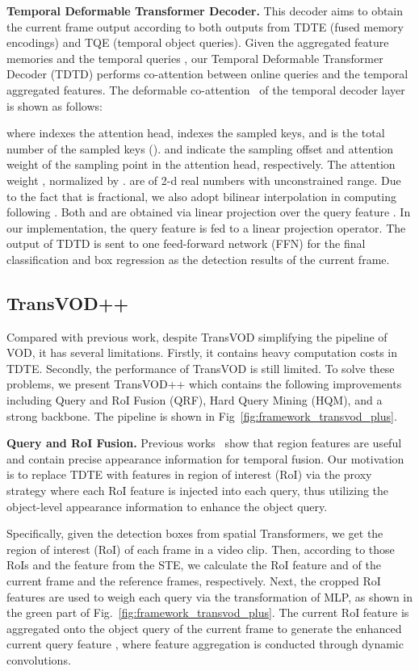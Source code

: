 \documentclass[10pt,journal,compsoc]{IEEEtran}
\begin{document}
\noindent
\textbf{Temporal Deformable Transformer Decoder.}
This decoder aims to obtain the current frame output according to both outputs from TDTE (fused memory encodings) and TQE (temporal object queries). Given the aggregated feature memories   and the temporal queries , our Temporal Deformable Transformer Decoder (TDTD) performs co-attention between online queries and the temporal aggregated features.
The deformable co-attention~\cite{zhu2020deformable} of the temporal decoder layer is shown as follows:

where  indexes the attention head,  indexes the sampled keys, and  is the total number of the sampled keys ().
 and  indicate the sampling offset and attention weight of the  sampling point in the  attention head, respectively.
The attention weight , normalized by .  are of 2-d real numbers with unconstrained range. Due to the fact that  is fractional, we also adopt bilinear interpolation in computing  following \cite{dai2017deformable}. 
Both  and  are obtained via linear projection over the query feature . In our implementation, the query feature  is fed to a linear projection operator. The output of TDTD is sent to one feed-forward network (FFN) for the final classification and box regression as the detection results of the current frame.

\vspace{-4mm}
\subsection{TransVOD++}
\label{sec:TransVOD++}
Compared with previous work, despite TransVOD simplifying the pipeline of VOD, it has several limitations. Firstly, it contains heavy computation costs in TDTE. Secondly, the performance of TransVOD is still limited. To solve these problems, we present TransVOD++ which contains the following improvements including Query and RoI Fusion (QRF), Hard Query Mining (HQM), and a strong backbone. The pipeline is shown in Fig~\ref{fig:framework_transvod_plus}.

\noindent
\textbf{Query and RoI Fusion.} Previous works~\cite{chen2020memory,hu18relationnet} show that region features are useful and contain precise appearance information for temporal fusion. Our motivation is to replace TDTE with features in region of interest (RoI) via the proxy strategy where each RoI feature is injected into each query, thus utilizing the object-level appearance information to enhance the object query.


Specifically, given the detection boxes from spatial Transformers, we get the region of interest (RoI) of each frame in a video clip. Then, according to those RoIs and the feature from the STE, we calculate the RoI feature  and  of the current frame and the reference frames, respectively. Next, the cropped RoI features are used to weigh each query via the transformation of MLP, as shown in the green part of Fig.~\ref{fig:framework_transvod_plus}.
The current RoI feature  is aggregated onto the object query of the current frame to generate the enhanced current query feature , where feature aggregation is conducted through dynamic convolutions.  
\end{document}
